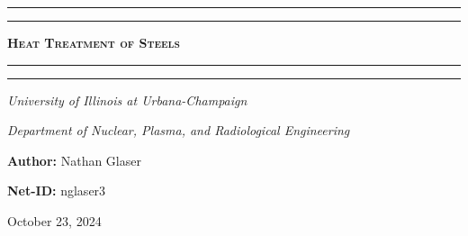 \documentclass{article}
\begin{document}
\newcommand{\Fig}[3]{\begin{figure}[!h!]\centering\texttt{[image: \#1]}\caption{#2}\label{#3}\end{figure}}
\begin{titlepage}

\centering
\scshape
\vspace{\baselineskip}

%
\rule{\textwidth}{1.6pt}\vspace*{-\baselineskip}\vspace*{2pt}
\rule{\textwidth}{0.4pt}

{\Huge \textbf{\textsc{ Heat Treatment of Steels \\
\vspace{15pt}}}}

\rule{\textwidth}{0.4pt}\vspace*{-\baselineskip}\vspace{3.2pt}
\rule{\textwidth}{1.6pt}\vspace{6pt}
\centerline{\textit{University of Illinois at Urbana-Champaign}} 
\centerline{\textit{Department of Nuclear, Plasma, and Radiological Engineering}}
\vspace{1.5\baselineskip}


\large \centerline{\textbf{Author:} Nathan Glaser}
\large \centerline{\textbf{Net-ID:} nglaser3}
\quad

\vfill
\large \centerline{October 23, 2024}
%
\end{titlepage}

\tableofcontents
\newpage
{}
\end{document}
